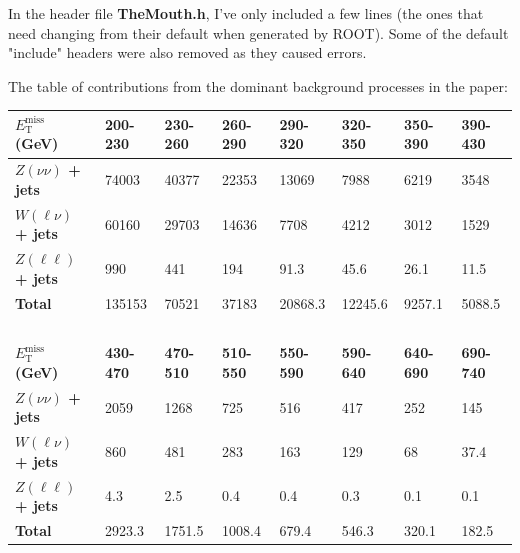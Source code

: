 In the header file \textbf{TheMouth.h}, I've only included a few lines (the ones that need changing from their default when generated by ROOT). Some of the default "include" headers were also removed as they caused errors.



The table of contributions from the dominant background processes in the paper:

\begin{table}[H]
\centering
    \begin{tabular}{|l|lllllll|}
    \hline
    
    \textbf{$E_{\mathrm{T}}^{\mathrm{miss}}$ (GeV)}       & \textbf{200-230} & \textbf{230-260} & \textbf{260-290}  & \textbf{290-320} & \textbf{320-350}  & \textbf{350-390}  & \textbf{390-430} \\ \hline
    
    \textbf{$Z(\nu\nu)$ + jets} & 74003   & 40377   & 22353    & 13069   & 7988     & 6219      & 3548    \\ \hline
    \textbf{$W(\ell\nu)$ + jets} & 60160   & 29703   & 14636    & 7708    & 4212     & 3012      & 1529    \\ \hline
    \textbf{$Z(\ell\ell)$ + jets} & 990     & 441     & 194      & 91.3    & 45.6     & 26.1      & 11.5    \\ \hline
    \textbf{Total}        & 135153  & 70521   & 37183    & 20868.3 & 12245.6  & 9257.1    & 5088.5  \\ \hline
    
    ~            & ~       & ~       & ~        & ~       & ~        & ~         & ~       \\ \hline
    
    \textbf{$E_{\mathrm{T}}^{\mathrm{miss}}$ (GeV)}      & \textbf{430-470} & \textbf{470-510} & \textbf{510-550}  & \textbf{550-590} & \textbf{590-640}  & \textbf{640-690}   & \textbf{690-740} \\ \hline
    
    \textbf{$Z(\nu\nu)$ + jets} & 2059    & 1268    & 725      & 516     & 417      & 252       & 145     \\ \hline
    \textbf{$W(\ell\nu)$ + jets} & 860     & 481     & 283      & 163     & 129      & 68        & 37.4    \\ \hline
    \textbf{$Z(\ell\ell)$ + jets} & 4.3     & 2.5     & 0.4    & 0.4   & 0.3    & 0.1    & 0.1   \\ \hline
    \textbf{Total}        & 2923.3  & 1751.5  & 1008.4 & 679.4 & 546.3  & 320.1   & 182.5 \\ \hline
    

\end{tabular}
\end{table}
